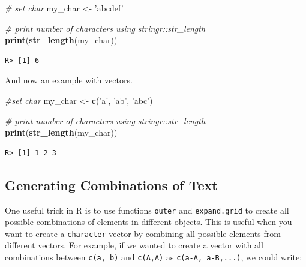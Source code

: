\documentclass[
  12pt,
]{book}
\newenvironment{Shaded}{\begin{snugshade}}{\end{snugshade}}
\newcommand{\CommentTok}[1]{\textcolor[rgb]{0.37,0.37,0.37}{\textit{#1}}}
\newcommand{\KeywordTok}[1]{\textcolor[rgb]{0.27,0.27,0.27}{\textbf{#1}}}
\newcommand{\NormalTok}[1]{#1}
\newcommand{\StringTok}[1]{\textcolor[rgb]{0.5,0.5,0.5}{#1}}
\begin{document}
\begin{Shaded}
\begin{Highlighting}[]
\CommentTok{# set char}
\NormalTok{my_char <-}\StringTok{ 'abcdef'}

\CommentTok{# print number of characters using stringr::str_length}
\KeywordTok{print}\NormalTok{(}\KeywordTok{str_length}\NormalTok{(my_char))}
\end{Highlighting}
\end{Shaded}

\begin{verbatim}
R> [1] 6
\end{verbatim}

And now an example with vectors.

\begin{Shaded}
\begin{Highlighting}[]
\CommentTok{#set char}
\NormalTok{my_char <-}\StringTok{ }\KeywordTok{c}\NormalTok{(}\StringTok{'a'}\NormalTok{, }\StringTok{'ab'}\NormalTok{, }\StringTok{'abc'}\NormalTok{)}

\CommentTok{# print number of characters using stringr::str_length}
\KeywordTok{print}\NormalTok{(}\KeywordTok{str_length}\NormalTok{(my_char))}
\end{Highlighting}
\end{Shaded}

\begin{verbatim}
R> [1] 1 2 3
\end{verbatim}

\hypertarget{generating-combinations-of-text}{%
\subsection{Generating Combinations of Text}\label{generating-combinations-of-text}}

One useful trick in R is to use functions \texttt{outer} and \texttt{expand.grid} to create all possible combinations of elements in different objects. This is useful when you want to create a \texttt{character} vector by combining all possible elements from different vectors. For example, if we wanted to create a vector with all combinations between \texttt{c(\textquotesingle{}a\textquotesingle{},\ \textquotesingle{}b\textquotesingle{})} and \texttt{\textquotesingle{}c(\textquotesingle{}A\textquotesingle{},\textquotesingle{}A\textquotesingle{})} as \texttt{c(\textquotesingle{}a-A\textquotesingle{},\ \textquotesingle{}a-B\textquotesingle{},...)}, we could write:
\end{document}
